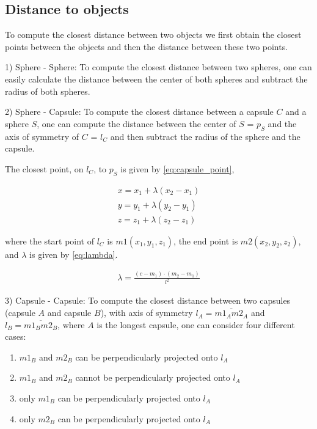 \documentclass[a4paper, 10pt, conference]{ieeeconf}      %
\begin{document}
\subsection{Distance to objects} %
To compute the closest distance between two objects we first obtain the closest points between the objects and then the distance between these two points.

1) Sphere - Sphere: 
To compute the closest distance between two spheres, one can easily calculate the distance between the center of both spheres and subtract the radius of both spheres.

2) Sphere - Capsule:
To compute the closest distance between a capsule $C$ and a sphere $S$, one can compute the distance between the center of $S$ = $p_S$ and the axis of symmetry of $C$ = $l_C$
and then subtract the radius of the sphere and the capsule. 

The closest point, on $l_C$, to $p_S$ is given by \eqref{eq:capsule_point},

\begin{equation}       
    \begin{matrix} 
        x = x_1 + \lambda(x_2 - x_1) \\
        y = y_1 + \lambda(y_2 - y_1) \\
        z = z_1 + \lambda(z_2 - z_1) \label{eq:capsule_point}
    \end{matrix}
\end{equation}

where the start point of $l_C$ is $m1(x_1, y_1, z_1)$, the end point is $m2(x_2, y_2, z_2)$, and $\lambda$ is given by \eqref{eq:lambda}.

\begin{equation}       
    \begin{matrix} 
        \lambda = \frac{(c - m_1) \cdot (m_2 - m_1 )}{l^2} \label{eq:lambda}
    \end{matrix}
\end{equation}

3) Capsule - Capsule:
To compute the closest distance between two capsules (capsule $A$ and capsule $B$), with axis of symmetry $l_A = \overline{m1_A m2_A}$ and $l_B = \overline{m1_B m2_B}$, 
where $A$ is the longest capsule, one can consider four different cases:
\begin{enumerate}
    \item $m1_B$ and $m2_B$ can be perpendicularly projected onto $l_A$
    \item $m1_B$ and $m2_B$ cannot be perpendicularly projected onto $l_A$
    \item only $m1_B$ can be perpendicularly projected onto $l_A$
    \item only $m2_B$ can be perpendicularly projected onto $l_A$
\end{enumerate} 
\end{document}
